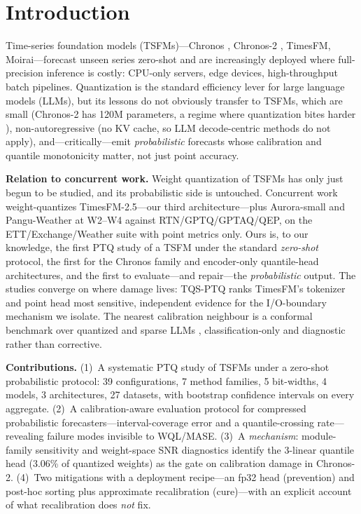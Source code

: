 \documentclass{article}
\begin{document}
\section{Introduction}
Time-series foundation models (TSFMs)---Chronos \citep{chronos}, Chronos-2
\citep{chronos2}, TimesFM, Moirai---forecast unseen series zero-shot and are increasingly
deployed where full-precision inference is costly: CPU-only servers, edge devices,
high-throughput batch pipelines. Quantization is the standard efficiency lever for large
language models (LLMs), but its lessons do not obviously transfer to TSFMs, which are
small (Chronos-2 has 120M parameters, a regime where quantization bites harder
\citep{qeval}), non-autoregressive (no KV cache, so LLM decode-centric methods do not
apply), and---critically---emit \emph{probabilistic} forecasts whose calibration and
quantile monotonicity matter, not just point accuracy.

\vspace{1pt}\noindent\textbf{Relation to concurrent work.} Weight quantization of TSFMs
has only just begun to be studied, and its probabilistic side is untouched. Concurrent
work \citep[TQS-PTQ;][]{tqsptq} weight-quantizes TimesFM-2.5---our third
architecture---plus Aurora-small and Pangu-Weather at W2--W4 against RTN/GPTQ/GPTAQ/QEP,
on the ETT/Exchange/Weather suite with point metrics only. Ours is, to our knowledge, the
first PTQ study of a TSFM under the standard \emph{zero-shot} protocol, the first for the
Chronos family and encoder-only quantile-head architectures, and the first to
evaluate---and repair---the \emph{probabilistic} output. The studies converge on where
damage lives: TQS-PTQ ranks TimesFM's tokenizer and point head most sensitive, independent
evidence for the I/O-boundary mechanism we isolate. The nearest calibration neighbour is a
conformal benchmark over quantized and sparse LLMs \citep{conformalcompress},
classification-only and diagnostic rather than corrective.

\vspace{1pt}\noindent\textbf{Contributions.} (1)~A systematic PTQ study of TSFMs under a
zero-shot probabilistic protocol: 39 configurations, 7 method families, 5 bit-widths, 4
models, 3 architectures, 27 datasets, with bootstrap confidence intervals on every
aggregate. (2)~A calibration-aware evaluation protocol for compressed probabilistic
forecasters---interval-coverage error and a quantile-crossing rate---revealing failure
modes invisible to WQL/MASE. (3)~A \emph{mechanism}: module-family sensitivity and
weight-space SNR diagnostics identify the 3-linear quantile head (3.06\% of quantized
weights) as the gate on calibration damage in Chronos-2. (4)~Two mitigations with a
deployment recipe---an fp32 head (prevention) and post-hoc sorting plus approximate
recalibration (cure)---with an explicit account of what recalibration does \emph{not} fix.
\end{document}
